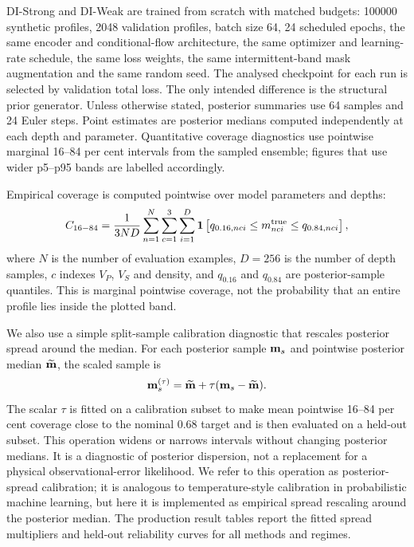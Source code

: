 \documentclass[referee]{gji}
\begin{document}
DI-Strong and DI-Weak are trained from scratch with matched budgets: 100000 synthetic profiles, 2048 validation profiles, batch size 64, 24 scheduled epochs, the same encoder and conditional-flow architecture, the same optimizer and learning-rate schedule, the same loss weights, the same intermittent-band mask augmentation and the same random seed. The analysed checkpoint for each run is selected by validation total loss. The only intended difference is the structural prior generator. Unless otherwise stated, posterior summaries use 64 samples and 24 Euler steps. Point estimates are posterior medians computed independently at each depth and parameter. Quantitative coverage diagnostics use pointwise marginal 16--84 per cent intervals from the sampled ensemble; figures that use wider p5--p95 bands are labelled accordingly.

Empirical coverage is computed pointwise over model parameters and depths:
\begin{equation}
C_{16-84}=
\frac{1}{3ND}
\sum_{n=1}^{N}
\sum_{c=1}^{3}
\sum_{i=1}^{D}
{\bf 1}\left[
q_{0.16,nci}\le m^{\rm true}_{nci}\le q_{0.84,nci}
\right],
\label{eq:coverage}
\end{equation}
where $N$ is the number of evaluation examples, $D=256$ is the number of depth samples, $c$ indexes $V_P$, $V_S$ and density, and $q_{0.16}$ and $q_{0.84}$ are posterior-sample quantiles. This is marginal pointwise coverage, not the probability that an entire profile lies inside the plotted band.

We also use a simple split-sample calibration diagnostic that rescales posterior spread around the median. For each posterior sample ${\bf m}_s$ and pointwise posterior median $\widetilde{\bf m}$, the scaled sample is
\begin{equation}
{\bf m}^{(\tau)}_s=
\widetilde{\bf m}+\tau({\bf m}_s-\widetilde{\bf m}).
\label{eq:temperature}
\end{equation}
The scalar $\tau$ is fitted on a calibration subset to make mean pointwise 16--84 per cent coverage close to the nominal 0.68 target and is then evaluated on a held-out subset. This operation widens or narrows intervals without changing posterior medians. It is a diagnostic of posterior dispersion, not a replacement for a physical observational-error likelihood. We refer to this operation as posterior-spread calibration; it is analogous to temperature-style calibration in probabilistic machine learning, but here it is implemented as empirical spread rescaling around the posterior median. The production result tables report the fitted spread multipliers and held-out reliability curves for all methods and regimes.
\end{document}
